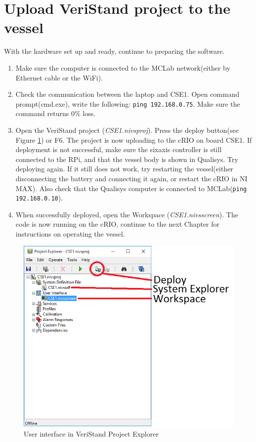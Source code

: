 \section{Upload VeriStand project to the vessel}
With the hardware set up and ready, continue to preparing the software. 
\begin{enumerate}
	\item Make sure the computer is connected to the MCLab network(either by Ethernet cable or the WiFi). 
	\item Check the communication between the laptop and CSE1. Open command prompt(cmd.exe), write the following: \texttt{ping 192.168.0.75}. Make sure the command returns 0\% loss.
	\item Open the VeriStand project (\textit{CSE1.nivsproj}). Press the deploy button(see Figure \ref{fig:project_explorer}) or F6. The project is now uploading to the cRIO on board CSE1. If deployment is not successful, make sure the sixaxis controller is still connected to the RPi, and that the vessel body is shown in Qualisys. Try deploying again. If it still does not work, try restarting the vessel(either disconnecting the battery and connecting it again, or restart the cRIO in NI MAX). Also check that the Qualisys computer is connected to MCLab(\texttt{ping 192.168.0.10}). 
	\item When successfully deployed, open the Workspace (\textit{CSE1.nivsscreen}). The code is now running on the cRIO, continue to the next Chapter for instructions on operating the vessel. 
\end{enumerate}
\begin{figure}[htb!]
	\centering
	\includegraphics[scale=0.8]{fig/project_explorer.png}
	\caption{User interface in VeriStand Project Explorer}
	\label{fig:project_explorer}
\end{figure}
